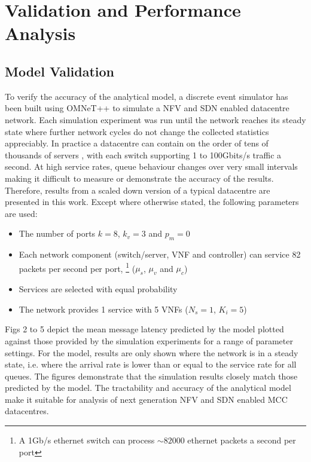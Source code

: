 \section{Validation and Performance Analysis}
\label{sec:validation}

\subsection{Model Validation}

To verify the accuracy of the analytical model, a discrete event simulator has been built using OMNeT++ \cite{VargaH08} to simulate a NFV and SDN enabled datacentre network. Each simulation experiment was run until the network reaches its steady state where further network cycles do not change the collected statistics appreciably. In practice a datacentre can contain on the order of tens of thousands of servers \cite{AWS16}, with each switch supporting 1 to 100Gbits/s traffic a second. At high service rates, queue behaviour changes over very small intervals making it difficult to measure or demonstrate the accuracy of the results. Therefore, results from a scaled down version of a typical datacentre are presented in this work. Except where otherwise stated, the following parameters are used:

\begin{itemize}
	\item The number of ports $k = 8$, $k_{v} = 3$ and $p_{m} = 0$
	\item Each network component (switch/server, VNF and controller) can service 82 packets per second per port, \footnote{A 1Gb/s ethernet switch can process $\sim\!82000$ ethernet packets a second per port} ($\mu_{s}$, $\mu_{v}$ and $\mu_{c}$)
	\item Services are selected with equal probability
	\item The network provides 1 service with 5 VNFs ($N_s = 1$, $K_i = 5$)
\end{itemize}

Figs 2 to 5 depict the mean message latency predicted by the model plotted against those provided by the simulation experiments for a range of parameter settings. For the model, results are only shown where the network is in a steady state, i.e. where the arrival rate is lower than or equal to the service rate for all queues. The figures demonstrate that the simulation results closely match those predicted by the model. The tractability and accuracy of the analytical model make it suitable for analysis of next generation NFV and SDN enabled MCC datacentres.

